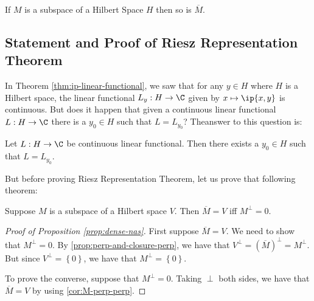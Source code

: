 \begin{exercise}
    If $M$ is a subspace of a Hilbert Space $H$ then so is $\overline M$.
\end{exercise}
\subsection{Statement and Proof of Riesz Representation Theorem}
In Theorem \ref{thm:ip-linear-functional}, we saw that for any $y \in H$ where $H$ is a Hilbert space, the linear functional $L_{y} : H \to \C$ given by $x \mapsto \ip{x,y}$ is continuous. But does it happen that given a continuous linear functional $L : H \to \C$ there is a $y_{0} \in H$ such that $L = L_{y_{0}}$? Theanswer to this question is:

\begin{theorem}
    Let $L : H \to \C$ be continuous linear functional. Then there exists a $y_{0} \in H$ such that $L=L_{y_{0}}$.
    \label{thm:riesz-rep-thm-for-hilbert}
\end{theorem}

But before proving Riesz Representation Theorem, let us prove that following theorem:

\begin{proposition}
  Suppose $M$ is a subspace of a Hilbert space $V$. Then $\overline M = V$ iff $M^{\perp} = 0$.
  \label{prop:dense-nas}
\end{proposition}
\begin{proof}[Proof of Proposition \ref{prop:dense-nas}]
  First suppose $\overline M = V$. We need to show that $M^{\perp} = 0$. By \ref{prop:perp-and-closure-perp}, we have that $V^{\perp} = \left( \overline M \right)^{\perp} = M^{\perp}$. But since $V^{\perp} = \left\{ 0 \right\}$, we have that $M^{\perp} = \left\{ 0 \right\}$.

  To prove the converse, suppose that $M^{\perp} = 0$. Taking $\perp$ both sides, we have that $\overline M = V$ by using \ref{cor:M-perp-perp}.
\end{proof}



